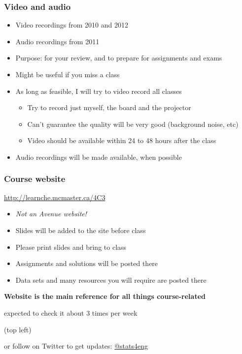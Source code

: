 \begin{frame}\frametitle{Video and audio}
	\begin{itemize}
		\item	Video recordings from 2010 and 2012 
		\item	Audio recordings from 2011
		\item	Purpose: for your review, and to prepare for assignments and exams 
		\item	Might be useful if you miss a class
		\item	As long as feasible, I will try to video record all classes
		\begin{itemize}
			\item	Try to record just myself, the board and the projector 
			\item	Can't guarantee the quality will be very good (background noise, etc) 
			\item	Video should be available within 24 to 48 hours after the class 
		\end{itemize}
		\item	Audio recordings will be made available, when possible 
	\end{itemize}
\end{frame}

\begin{frame}\frametitle{Course website}
	
	\begin{exampleblock}{}
		\centering 
		\href{http://learnche.mcmaster.ca/4C3}{http://learnche.mcmaster.ca/4C3}
	\end{exampleblock}
	\begin{itemize}
		\item	\emph{Not an Avenue website!}
		\item	Slides will be added to the site before class
		\item	Please print slides and bring to class
		\item	Assignments and solutions will be posted there
		\item	Data sets and many resources you will require are posted there
	\end{itemize}
	\vspace{12pt}
	\textbf{ Website is the main reference for all things course-related} 
	\begin{itemize}
		\item	expected to check it about 3 times per week {\tiny (top left)
		\item	or follow on Twitter to get updates: \href{https://twitter.com/stats4eng}{@stats4eng}}
	\end{itemize}
\end{frame}

